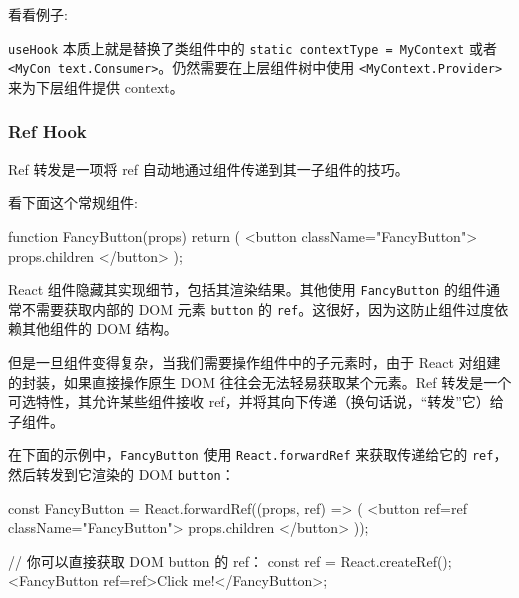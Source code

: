 看看例子:



\texttt{useHook} 本质上就是替换了类组件中的 \texttt{static contextType = MyContext} 或者 \texttt{<MyCon text.Consumer>}。仍然需要在上层组件树中使用 \texttt{<MyContext.Provider>} 来为下层组件提供 context。

\subsubsection{Ref Hook}

Ref 转发是一项将 ref 自动地通过组件传递到其一子组件的技巧。

看下面这个常规组件:

\begin{JavaScript}
function FancyButton(props) {
  return (
    <button className="FancyButton">
      {props.children}
    </button>
  );
}
\end{JavaScript}

React 组件隐藏其实现细节，包括其渲染结果。其他使用 \texttt{FancyButton} 的组件通常不需要获取内部的 DOM 元素 \texttt{button} 的 \texttt{ref}。这很好，因为这防止组件过度依赖其他组件的 DOM 结构。

但是一旦组件变得复杂，当我们需要操作组件中的子元素时，由于 React 对组建的封装，如果直接操作原生 DOM 往往会无法轻易获取某个元素。Ref 转发是一个可选特性，其允许某些组件接收 ref，并将其向下传递（换句话说，“转发”它）给子组件。

在下面的示例中，\texttt{FancyButton} 使用 \texttt{React.forwardRef} 来获取传递给它的 \texttt{ref}，然后转发到它渲染的 DOM \texttt{button}：

\begin{JavaScript}
const FancyButton = React.forwardRef((props, ref) => (
  <button ref={ref} className="FancyButton">
    {props.children}
  </button>
));

// 你可以直接获取 DOM button 的 ref：
const ref = React.createRef();
<FancyButton ref={ref}>Click me!</FancyButton>;
\end{JavaScript}


